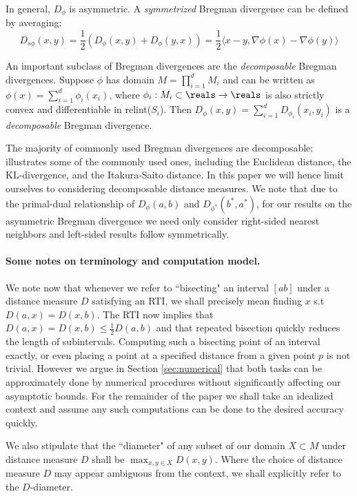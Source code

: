 \documentclass[11pt]{myclass}
\newcommand{\breg}{\ensuremath{D_\phi}}
\newcommand{\sbreg}{\ensuremath{D_{s\phi}}}
\begin{document}
In general, $\breg$ is asymmetric. A \emph{symmetrized} Bregman divergence can be defined by averaging: 
\begin{equation} \sbreg(x,y) = \frac{1}{2}(\breg(x,y) + \breg(y,x)) = \frac{1}{2}\langle x - y, \nabla \phi(x) - \nabla \phi(y) \rangle
\end{equation}


An important subclass of Bregman divergences are the \emph{decomposable} Bregman divergences. Suppose $\phi$ has domain $M = \prod_{i=1}^d M_i $ and can be written as $\phi(x) = \sum_{i=1}^d \phi_i(x_i)$, where $\phi_i :M_i \subset \reals \to \reals$ is 
also strictly convex and differentiable in relint($S_i$). Then $ \breg(x,y) = \sum_{i=1}^d D_{\phi_i}(x_i, y_i)$
is a \emph{decomposable} Bregman divergence. 

 The majority of commonly used Bregman divergences are decomposable:~\cite[Chapter 3]{cayton-thesis} illustrates some of the commonly used ones, including the Euclidean distance, the KL-divergence, and the Itakura-Saito distance.
 In this paper we will hence limit ourselves to considering decomposable distance measures. 
We note that due to the primal-dual relationship of  $\breg(a,b)$ and  $D_{\phi^*}(b^*, a^*)$, 
for our results on the asymmetric Bregman divergence we need only consider right-sided nearest neighbors and left-sided results follow symmetrically.

\paragraph{Some notes on terminology and computation model.}
We note now that whenever we refer to ``bisecting" an interval $[a b]$ under a distance measure $D$ satisfying an RTI, we shall precisely mean finding $x$ s.t $D(a,x) = D(x,b)$. The RTI now implies that $D(a,x) = D(x,b) \leq \frac{1}{2} D(a,b)$
and that repeated bisection quickly reduces the length of subintervals. Computing
such a bisecting point of an interval exactly, or even placing a point at a specified distance from a given point $p$ is not
trivial. However we argue in Section \ref{sec:numerical} that both tasks can be approximately done by numerical procedures
without significantly affecting our asymptotic bounds. For the remainder of the paper we shall take an idealized context and assume any such computations
can be done to the desired accuracy quickly. 

We also stipulate that the ``diameter" of any subset of our domain $X \subset M$ under distance measure $D$ shall be $\max_{x,y \in X} D(x,y)$.
Where the choice of distance measure $D$ may appear ambiguous from the context, we shall explicitly refer to the $D$-diameter.
\end{document}
